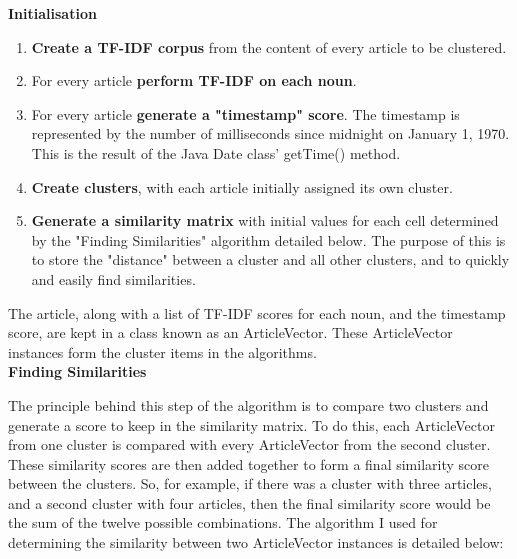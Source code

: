 \documentclass[12pt]{article}
\begin{document}
\textbf{Initialisation}

\begin{enumerate}
	\item \textbf{Create a TF-IDF corpus} from the content of every article to be clustered. \\
	\item For every article \textbf{perform TF-IDF on each noun}. \\
	\item For every article \textbf{generate a "timestamp" score}. The timestamp is represented by the number of milliseconds since midnight on January 1, 1970. This is the result of the Java Date class' getTime() method.\\
	\item \textbf{Create clusters}, with each article initially assigned its own cluster. \\
	\item \textbf{Generate a similarity matrix} with initial values for each cell determined by the "Finding Similarities" algorithm detailed below. The purpose of this is to store the "distance" between a cluster and all other clusters, and to quickly and easily find similarities. \\
\end{enumerate}

The article, along with a list of TF-IDF scores for each noun, and the timestamp score, are kept in a class known as an ArticleVector. These ArticleVector instances form the cluster items in the algorithms. \\

\textbf{Finding Similarities}

The principle behind this step of the algorithm is to compare two clusters and generate a score to keep in the similarity matrix. To do this, each ArticleVector from one cluster is compared with every ArticleVector from the second cluster. These similarity scores are then added together to form a final similarity score between the clusters. So, for example, if there was a cluster with three articles, and a second cluster with four articles, then the final similarity score would be the sum of the twelve possible combinations. The algorithm I used for determining the similarity between two ArticleVector instances is detailed below: \\
\end{document}
